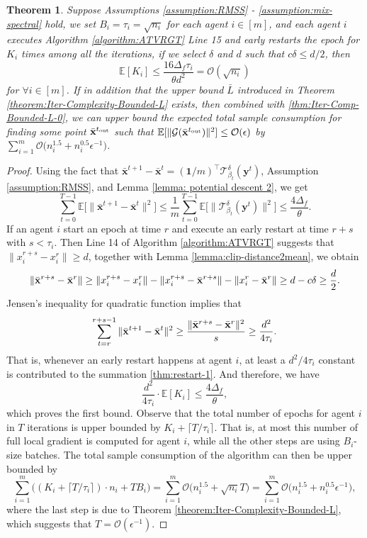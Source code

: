 \documentclass{article}
\newtheorem{theorem}{Theorem}[section]
\newcommand{\cG}{\mathcal{G}}
\newcommand{\cO}{\mathcal{O}}
\newcommand{\ctdb}{\mathcal{T}^\delta_{\beta_t}}
\newcommand{\byt}{\mathbf{y}^t}
\newcommand{\bbxt}{\bar{\mathbf{x}}^t}
\newcommand{\bbxte}{\bar{\mathbf{x}}^{t+1}}
\newcommand{\EE}{\mathbb{E}}
\newcommand{\bone}{\mathbf{1}}
\begin{document}
\begin{theorem}\label{theorem:restart}
Suppose Assumptions \ref{assumption:RMSS} - \ref{assumption:mix-spectral} hold, we set $B_i = \tau_i = \sqrt{n_i}$ for each agent $i\in[m]$, and each agent $i$ executes Algorithm \ref{algorithm:ATVRGT} Line 15 and early restarts the epoch for $K_i$ times among all the iterations,  if we select $\delta$ and $d$ such that  $c\delta\leq d/2$, then 
$$\EE[K_i]\leq \frac{16\Delta_f\tau_i}{\theta d^2} = \cO(\sqrt{n_i})$$
for $\forall i\in[m]$. If in addition that the upper bound $\bar{L}$ introduced in Theorem \ref{theorem:Iter-Complexity-Bounded-L} exists, then combined with \eqref{thm:Iter-Comp-Bounded-L-0}, we can upper bound the expected total sample consumption for finding some point $\bar{\bf x}^{t_{\rm out}}$ such that  $\EE[\|\cG(\bar{\bf x}^{t_{\rm out}})\|^2]\leq \cO(\epsilon)$ by  $\sum_{i=1}^m \cO\big(n_i^{1.5}+n_i^{0.5}\epsilon^{-1}\big)$. 
\end{theorem}
\begin{proof}
Using the fact that $\bbxte-\bbxt = (\bone/m)^\top\ctdb(\byt)$, Assumption \ref{assumption:RMSS}, and  Lemma \ref{lemma: potential descent 2}, we get
\begin{equation}\label{thm:restart-1}
\sum_{t=0}^{T-1}\EE\big[\|\bbxte-\bbxt\|^2\big]\leq \frac{1}{m}\sum_{t=0}^{T-1}\EE\big[\|\ctdb(\byt)\|^2\big]\leq \frac{4\Delta_f}{\theta}.
\end{equation}
If an agent $i$ start an epoch at time $r$ and execute an early restart at time $r+s$ with $s<\tau_i$. Then Line 14 of Algorithm \ref{algorithm:ATVRGT} suggests that $\|x_i^{r+s}-x_i^r\|\geq d$, together with Lemma \ref{lemma:clip-distance2mean}, we obtain 
$$\|\bar{\bf x}^{r+s}-\bar{\bf x}^{r}\|\geq \|x_i^{r+s}-x_i^r\|-\|x_i^{r+s}-\bar{\bf x}^{r+s}\| - \|x_i^r-\bar{\bf x}^r\| \geq d-c\delta\geq \frac{d}{2}.$$
Jensen's inequality for quadratic function implies that
$$\sum_{t=r}^{r+s-1}\|\bbxte-\bbxt\|^2\geq\frac{\|\bar{\bf x}^{r+s}-\bar{\bf x}^{r}\|^2}{s} \geq \frac{d^2}{4\tau_i}.$$ 
That is, whenever an early restart happens at agent $i$, at least a $d^2/4\tau_i$ constant is contributed to the summation \eqref{thm:restart-1}. And therefore,  we have $$\frac{d^2}{4\tau_i}\cdot \EE[K_i] \leq \frac{4\Delta_f}{\theta},$$ which proves the first bound. Observe that the total number of epochs for agent $i$ in $T$ iterations is upper bounded by $K_i+\lceil T/\tau_i\rceil$. That is, at most this number of full local gradient is computed for agent $i$, while all the other steps are using $B_i$-size batches. The total sample consumption of the algorithm can then be upper bounded by 
$$\sum_{i=1}^m\Big((K_i+\lceil T/\tau_i\rceil)\cdot n_i + TB_i\Big) = \sum_{i=1}^m\cO\big( n_i^{1.5} + \sqrt{n_i}T\big) = \sum_{i=1}^m\cO\big(n_i^{1.5}+n_i^{0.5}\epsilon^{-1}\big),$$
where the last step is due to Theorem \ref{theorem:Iter-Complexity-Bounded-L}, which suggests that $T = \cO(\epsilon^{-1})$.
\end{proof}
\end{document}
